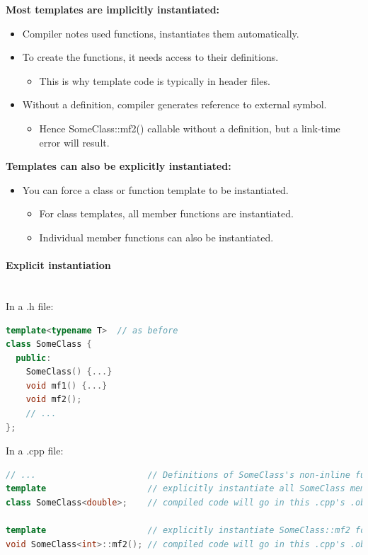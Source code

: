 \textbf{Most templates are implicitly instantiated:}
\begin{itemize}
  \item Compiler notes used functions, instantiates them automatically.
  \item To create the functions, it needs access to their definitions.
  \begin{itemize}
    \item This is why template code is typically in header files.
  \end{itemize}
  \item Without a definition, compiler generates reference to external symbol.
  \begin{itemize}
    \item Hence SomeClass::mf2() callable without a definition, but a link-time error will result.
  \end{itemize}
\end{itemize}
\textbf{Templates can also be explicitly instantiated:}
\begin{itemize}
  \item You can  force a class or function template to be instantiated.
  \begin{itemize}
    \item For class templates, all member functions are instantiated.
    \item Individual member functions can also be instantiated.
  \end{itemize}
\end{itemize}

\paragraph{Explicit instantiation}\\
In a .h file:
\begin{lstlisting}[language=C++]
template<typename T>  // as before
class SomeClass {
  public:
    SomeClass() {...}
    void mf1() {...}
    void mf2();
    // ...
};
\end{lstlisting}
In a .cpp file:
\begin{lstlisting}[language=C++]
// ...                      // Definitions of SomeClass's non-inline functions go here
template                    // explicitly instantiate all SomeClass member funcs for T=double
class SomeClass<double>;    // compiled code will go in this .cpp's .obj file

template                    // explicitly instantiate SomeClass::mf2 for T=int
void SomeClass<int>::mf2(); // compiled code will go in this .cpp's .obj file
\end{lstlisting}

